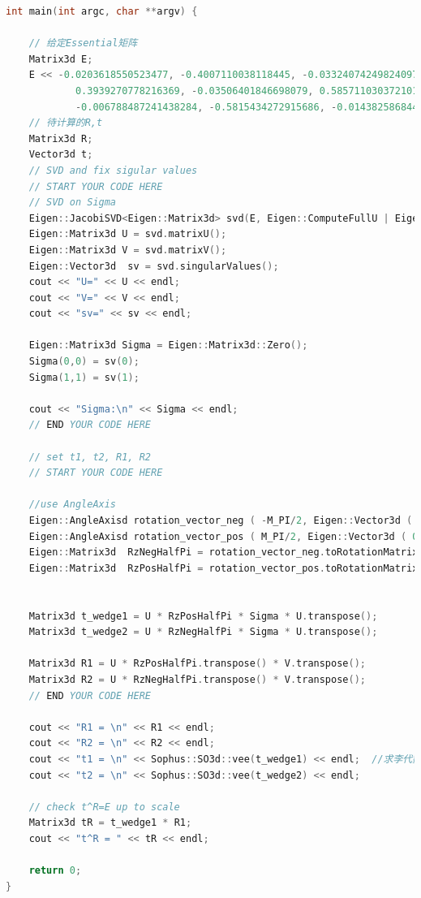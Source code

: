 \documentclass[40pt,a4paper，UTF8]{ctexart}
\numberwithin{equation}{section}
\begin{document}
\begin{lstlisting}[language=C++, caption=CMakeLists.txt]
int main(int argc, char **argv) {

    // 给定Essential矩阵
    Matrix3d E;
    E << -0.0203618550523477, -0.4007110038118445, -0.03324074249824097,
            0.3939270778216369, -0.03506401846698079, 0.5857110303721015,
            -0.006788487241438284, -0.5815434272915686, -0.01438258684486258;
    // 待计算的R,t
    Matrix3d R;
    Vector3d t;
    // SVD and fix sigular values
    // START YOUR CODE HERE
    // SVD on Sigma
    Eigen::JacobiSVD<Eigen::Matrix3d> svd(E, Eigen::ComputeFullU | Eigen::ComputeFullV);  //Eigen的svd函数，计算满秩的U和V
    Eigen::Matrix3d U = svd.matrixU();
    Eigen::Matrix3d V = svd.matrixV();
    Eigen::Vector3d  sv = svd.singularValues();
    cout << "U=" << U << endl;
    cout << "V=" << V << endl;
    cout << "sv=" << sv << endl;

    Eigen::Matrix3d Sigma = Eigen::Matrix3d::Zero();
    Sigma(0,0) = sv(0);
    Sigma(1,1) = sv(1);

    cout << "Sigma:\n" << Sigma << endl;
    // END YOUR CODE HERE

    // set t1, t2, R1, R2
    // START YOUR CODE HERE

    //use AngleAxis
    Eigen::AngleAxisd rotation_vector_neg ( -M_PI/2, Eigen::Vector3d ( 0,0,1 ) );     //沿 Z 轴旋转 -90 度
    Eigen::AngleAxisd rotation_vector_pos ( M_PI/2, Eigen::Vector3d ( 0,0,1 ) );     //沿 Z 轴旋转 90 度
    Eigen::Matrix3d  RzNegHalfPi = rotation_vector_neg.toRotationMatrix();
    Eigen::Matrix3d  RzPosHalfPi = rotation_vector_pos.toRotationMatrix();


    Matrix3d t_wedge1 = U * RzPosHalfPi * Sigma * U.transpose();
    Matrix3d t_wedge2 = U * RzNegHalfPi * Sigma * U.transpose();

    Matrix3d R1 = U * RzPosHalfPi.transpose() * V.transpose();
    Matrix3d R2 = U * RzNegHalfPi.transpose() * V.transpose();
    // END YOUR CODE HERE

    cout << "R1 = \n" << R1 << endl;
    cout << "R2 = \n" << R2 << endl;
    cout << "t1 = \n" << Sophus::SO3d::vee(t_wedge1) << endl;  //求李代数？？
    cout << "t2 = \n" << Sophus::SO3d::vee(t_wedge2) << endl;

    // check t^R=E up to scale
    Matrix3d tR = t_wedge1 * R1;
    cout << "t^R = " << tR << endl;

    return 0;
}
\end{lstlisting}
\end{document}
